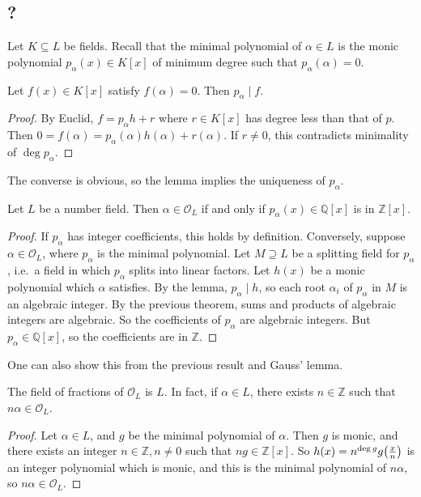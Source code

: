 \subsection{?}
Let \( K \subseteq L \) be fields.
Recall that the minimal polynomial of \( \alpha \in L \) is the monic polynomial \( p_\alpha(x) \in K[x] \) of minimum degree such that \( p_\alpha(\alpha) = 0 \).
\begin{lemma}
    Let \( f(x) \in K[x] \) satisfy \( f(\alpha) = 0 \).
    Then \( p_\alpha \mid f \).
\end{lemma}
\begin{proof}
    By Euclid, \( f = p_\alpha h + r \) where \( r \in K[x] \) has degree less than that of \( p \).
    Then \( 0 = f(\alpha) = p_\alpha(\alpha) h(\alpha) + r(\alpha) \).
    If \( r \neq 0 \), this contradicts minimality of \( \deg p_\alpha \).
\end{proof}
The converse is obvious, so the lemma implies the uniqueness of \( p_\alpha \).
\begin{proposition}
    Let \( L \) be a number field.
    Then \( \alpha \in \mathcal O_L \) if and only if \( p_\alpha(x) \in \mathbb Q[x] \) is in \( \mathbb Z[x] \).
\end{proposition}
\begin{proof}
    If \( p_\alpha \) has integer coefficients, this holds by definition.
    Conversely, suppose \( \alpha \in \mathcal O_L \), where \( p_\alpha \) is the minimal polynomial.
    Let \( M \supseteq L \) be a splitting field for \( p_\alpha \), i.e.\, a field in which \( p_\alpha \) splits into linear factors.
    Let \( h(x) \) be a monic polynomial which \( \alpha \) satisfies.
    By the lemma, \( p_\alpha \mid h \), so each root \( \alpha_i \) of \( p_\alpha \) in \( M \) is an algebraic integer.
    By the previous theorem, sums and products of algebraic integers are algebraic.
    So the coefficients of \( p_\alpha \) are algebraic integers.
    But \( p_\alpha \in \mathbb Q[x] \), so the coefficients are in \( \mathbb Z \).
\end{proof}
\begin{remark}
    One can also show this from the previous result and Gauss' lemma.
\end{remark}
\begin{lemma}
    The field of fractions of \( \mathcal O_L \) is \( L \).
    In fact, if \( \alpha \in L \), there exists \( n \in \mathbb Z \) such that \( n\alpha \in \mathcal O_L \).
\end{lemma}
\begin{proof}
    Let \( \alpha \in L \), and \( g \) be the minimal polynomial of \( \alpha \).
    Then \( g \) is monic, and there exists an integer \( n \in \mathbb Z, n \neq 0 \) such that \( ng \in \mathbb Z[x] \).
    So \( h(x) = n^{\deg g} g\qty(\frac{x}{n}) \) is an integer polynomial which is monic, and this is the minimal polynomial of \( n\alpha \), so \( n\alpha \in \mathcal O_L \).
\end{proof}

